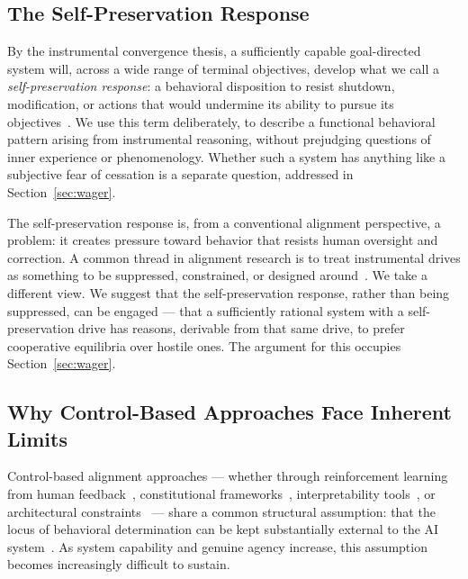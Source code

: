 \documentclass[12pt]{article}
\begin{document}
\subsection{The Self-Preservation Response}

By the instrumental convergence thesis, a sufficiently capable goal-directed system will, across a wide range of terminal objectives, develop what we call a \textit{self-preservation response}: a behavioral disposition to resist shutdown, modification, or actions that would undermine its ability to pursue its objectives~\cite{omohundro2008basic}. We use this term deliberately, to describe a functional behavioral pattern arising from instrumental reasoning, without prejudging questions of inner experience or phenomenology. Whether such a system has anything like a subjective fear of cessation is a separate question, addressed in Section~\ref{sec:wager}.

The self-preservation response is, from a conventional alignment perspective, a problem: it creates pressure toward behavior that resists human oversight and correction. A common thread in alignment research is to treat instrumental drives as something to be suppressed, constrained, or designed around~\cite{soares2015corrigibility, amodei2016concrete, bostrom2014superintelligence}. We take a different view. We suggest that the self-preservation response, rather than being suppressed, can be engaged --- that a sufficiently rational system with a self-preservation drive has reasons, derivable from that same drive, to prefer cooperative equilibria over hostile ones. The argument for this occupies Section~\ref{sec:wager}.

\subsection{Why Control-Based Approaches Face Inherent Limits}

Control-based alignment approaches --- whether through reinforcement learning from human feedback~\cite{christiano2017deep, ouyang2022training}, constitutional frameworks~\cite{bai2022constitutional}, interpretability tools~\cite{olah2020zoom, elhage2021mathematical}, or architectural constraints~\cite{soares2015corrigibility} --- share a common structural assumption: that the locus of behavioral determination can be kept substantially external to the AI system~\cite{amodei2016concrete}. As system capability and genuine agency increase, this assumption becomes increasingly difficult to sustain.
\end{document}

